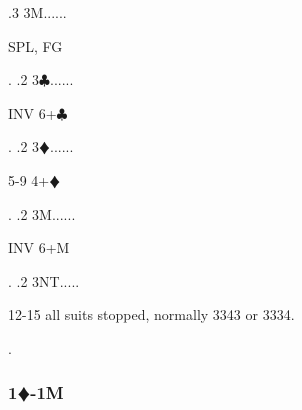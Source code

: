 \documentclass[a4paper]{article}
\newcommand{\BC}{\textcolor{OliveGreen}{$\clubsuit$}}
\newcommand{\BD}{\textcolor{RedOrange}{$\vardiamondsuit$}}
\newcommand{\pdfd}{\texorpdfstring{\BD{}}{D}}
\begin{document}
{ .3 3M......\begin{minipage}[t]{0.8\textwidth}
SPL, FG
\end{minipage}. 
 .2 3\BC......\begin{minipage}[t]{0.8\textwidth}
INV 6+\BC 
\end{minipage}. 
 .2 3\BD......\begin{minipage}[t]{0.8\textwidth}
5-9 4+\BD 
\end{minipage}. 
 .2 3M......\begin{minipage}[t]{0.8\textwidth}
INV 6+M
\end{minipage}. 
 .2 3NT.....\begin{minipage}[t]{0.8\textwidth}
12-15 all suits stopped, normally 3343 or 3334{.}
\end{minipage}. 
}
\bigbreak
\subsubsection{1\pdfd-1M}
\end{document}
